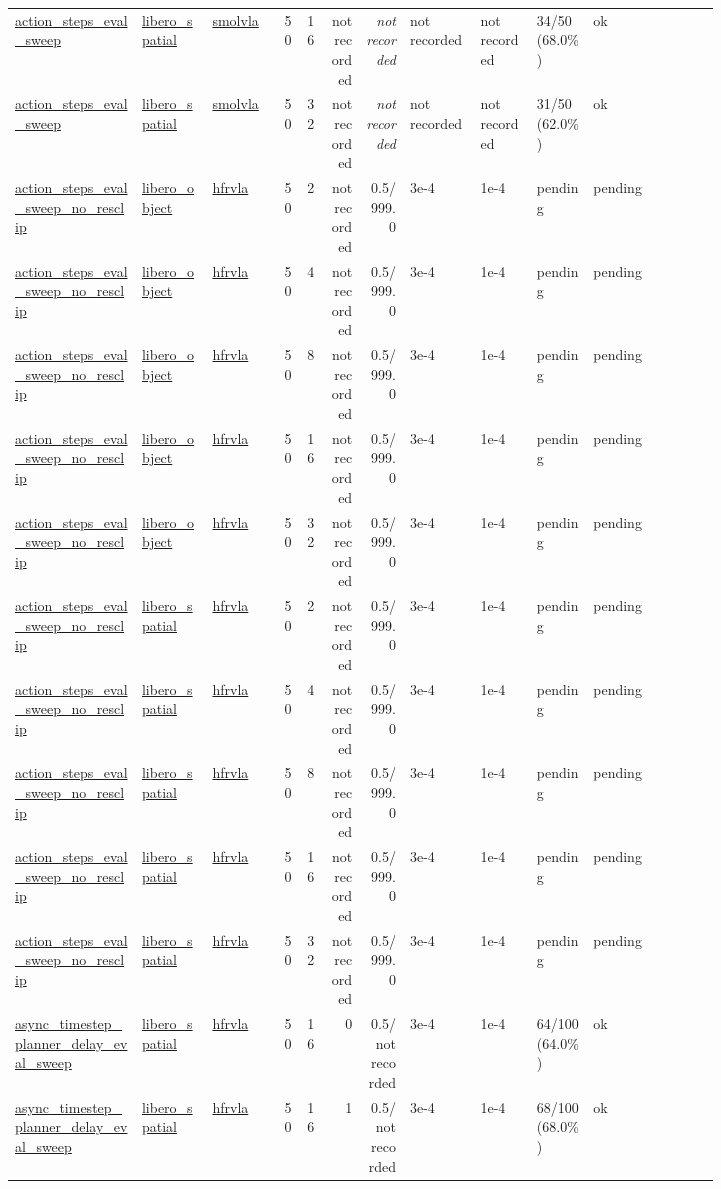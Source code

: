 \begin{tiny}
\begin{longtable}{@{}p{0.18\linewidth}p{0.10\linewidth}p{0.10\linewidth}rrrrp{0.10\linewidth}p{0.08\linewidth}p{0.08\linewidth}p{0.11\linewidth}p{0.07\linewidth}@{}}
\url{action_steps_eval_sweep} & \url{libero_spatial} & \url{smolvla} & 50 & 16 & not recorded & \emph{not recorded} & not recorded & not recorded & 34/50 (68.0\%) & ok \\
\url{action_steps_eval_sweep} & \url{libero_spatial} & \url{smolvla} & 50 & 32 & not recorded & \emph{not recorded} & not recorded & not recorded & 31/50 (62.0\%) & ok \\
\url{action_steps_eval_sweep_no_resclip} & \url{libero_object} & \url{hfrvla} & 50 & 2 & not recorded & 0.5/999.0 & 3e-4 & 1e-4 & pending & pending \\
\url{action_steps_eval_sweep_no_resclip} & \url{libero_object} & \url{hfrvla} & 50 & 4 & not recorded & 0.5/999.0 & 3e-4 & 1e-4 & pending & pending \\
\url{action_steps_eval_sweep_no_resclip} & \url{libero_object} & \url{hfrvla} & 50 & 8 & not recorded & 0.5/999.0 & 3e-4 & 1e-4 & pending & pending \\
\url{action_steps_eval_sweep_no_resclip} & \url{libero_object} & \url{hfrvla} & 50 & 16 & not recorded & 0.5/999.0 & 3e-4 & 1e-4 & pending & pending \\
\url{action_steps_eval_sweep_no_resclip} & \url{libero_object} & \url{hfrvla} & 50 & 32 & not recorded & 0.5/999.0 & 3e-4 & 1e-4 & pending & pending \\
\url{action_steps_eval_sweep_no_resclip} & \url{libero_spatial} & \url{hfrvla} & 50 & 2 & not recorded & 0.5/999.0 & 3e-4 & 1e-4 & pending & pending \\
\url{action_steps_eval_sweep_no_resclip} & \url{libero_spatial} & \url{hfrvla} & 50 & 4 & not recorded & 0.5/999.0 & 3e-4 & 1e-4 & pending & pending \\
\url{action_steps_eval_sweep_no_resclip} & \url{libero_spatial} & \url{hfrvla} & 50 & 8 & not recorded & 0.5/999.0 & 3e-4 & 1e-4 & pending & pending \\
\url{action_steps_eval_sweep_no_resclip} & \url{libero_spatial} & \url{hfrvla} & 50 & 16 & not recorded & 0.5/999.0 & 3e-4 & 1e-4 & pending & pending \\
\url{action_steps_eval_sweep_no_resclip} & \url{libero_spatial} & \url{hfrvla} & 50 & 32 & not recorded & 0.5/999.0 & 3e-4 & 1e-4 & pending & pending \\
\url{async_timestep_planner_delay_eval_sweep} & \url{libero_spatial} & \url{hfrvla} & 50 & 16 & 0 & 0.5/not recorded & 3e-4 & 1e-4 & 64/100 (64.0\%) & ok \\
\url{async_timestep_planner_delay_eval_sweep} & \url{libero_spatial} & \url{hfrvla} & 50 & 16 & 1 & 0.5/not recorded & 3e-4 & 1e-4 & 68/100 (68.0\%) & ok \\

\end{longtable}
\end{tiny}
